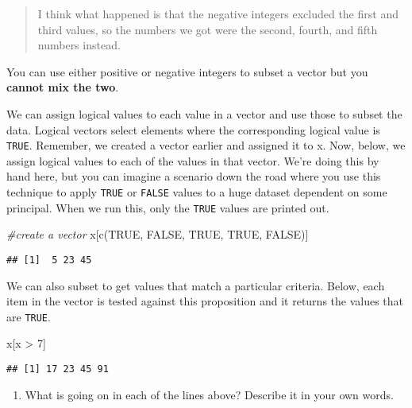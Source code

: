 \documentclass[
]{article}
\newenvironment{Shaded}{\begin{snugshade}}{\end{snugshade}}
\newcommand{\CommentTok}[1]{\textcolor[rgb]{0.56,0.35,0.01}{\textit{#1}}}
\newcommand{\ConstantTok}[1]{\textcolor[rgb]{0.00,0.00,0.00}{#1}}
\newcommand{\DecValTok}[1]{\textcolor[rgb]{0.00,0.00,0.81}{#1}}
\newcommand{\FunctionTok}[1]{\textcolor[rgb]{0.00,0.00,0.00}{#1}}
\newcommand{\NormalTok}[1]{#1}
\newcommand{\SpecialCharTok}[1]{\textcolor[rgb]{0.00,0.00,0.00}{#1}}
\providecommand{\tightlist}{%
  \setlength{\itemsep}{0pt}\setlength{\parskip}{0pt}}
\begin{document}
\begin{quote}
I think what happened is that the negative integers excluded the first
and third values, so the numbers we got were the second, fourth, and
fifth numbers instead.
\end{quote}

You can use either positive or negative integers to subset a vector but
you \textbf{cannot mix the two}.

We can assign logical values to each value in a vector and use those to
subset the data. Logical vectors select elements where the corresponding
logical value is \texttt{TRUE}. Remember, we created a vector earlier
and assigned it to x. Now, below, we assign logical values to each of
the values in that vector. We're doing this by hand here, but you can
imagine a scenario down the road where you use this technique to apply
\texttt{TRUE} or \texttt{FALSE} values to a huge dataset dependent on
some principal. When we run this, only the \texttt{TRUE} values are
printed out.

\begin{Shaded}
\begin{Highlighting}[]
\CommentTok{\#create a vector }
\NormalTok{x[}\FunctionTok{c}\NormalTok{(}\ConstantTok{TRUE}\NormalTok{, }\ConstantTok{FALSE}\NormalTok{, }\ConstantTok{TRUE}\NormalTok{, }\ConstantTok{TRUE}\NormalTok{, }\ConstantTok{FALSE}\NormalTok{)]}
\end{Highlighting}
\end{Shaded}

\begin{verbatim}
## [1]  5 23 45
\end{verbatim}

We can also subset to get values that match a particular criteria.
Below, each item in the vector is tested against this proposition and it
returns the values that are \texttt{TRUE}.

\begin{Shaded}
\begin{Highlighting}[]
\NormalTok{x[x }\SpecialCharTok{\textgreater{}} \DecValTok{7}\NormalTok{]}
\end{Highlighting}
\end{Shaded}

\begin{verbatim}
## [1] 17 23 45 91
\end{verbatim}

\begin{enumerate}
\def\labelenumi{(\arabic{enumi})}
\setcounter{enumi}{2}
\tightlist
\item
  What is going on in each of the lines above? Describe it in your own
  words.
\end{enumerate}
\end{document}

